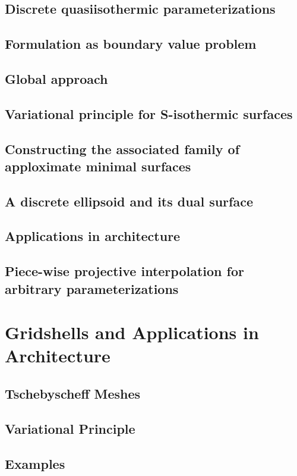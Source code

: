 \documentclass{book}
\begin{document}
\subsection{Discrete quasiisothermic parameterizations}

\subsection{Formulation as boundary value problem}
\subsection{Global approach}
\subsection{Variational principle for S-isothermic surfaces}
\subsection{Constructing the associated family of apploximate minimal surfaces}
\subsection{A discrete ellipsoid and its dual surface}
\subsection{Applications in architecture}
\subsection{Piece-wise projective interpolation for arbitrary parameterizations}

\section{Gridshells and Applications in Architecture}
\subsection{Tschebyscheff Meshes}
\subsection{Variational Principle}
\subsection{Examples}

\newpage
\backmatter 

\setcounter{secnumdepth}{-1} 

\end{document}
